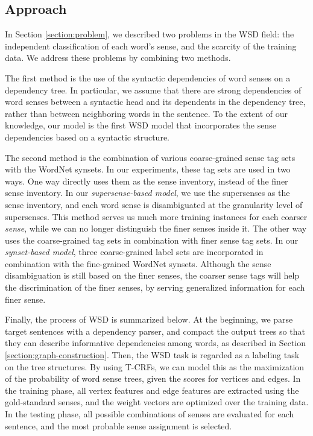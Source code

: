 \documentclass[english]{jnlp_1.4}
\begin{document}
\subsection{Approach}


In Section \ref{section:problem}, we described two problems in the WSD field: the independent classification of each word's sense, and the scarcity of the training data.
We address these problems by combining two methods.


The first method is the use of the syntactic dependencies of word senses on a dependency tree.
In particular, we assume that there are strong dependencies of word senses between a syntactic head and its dependents in the dependency tree, rather than between neighboring words in the sentence.
To the extent of our knowledge, our model is the first WSD model that incorporates the sense dependencies based on a syntactic structure.


The second method is the combination of various coarse-grained sense tag sets with the WordNet synsets.
In our experiments, these tag sets are used in two ways.
One way directly uses them as the sense inventory, instead of the finer sense inventory.
In our \textit{supersense-based model}, we use the supersenses as the sense inventory, and each word sense is disambiguated at the granularity level of supersenses.
This method serves us much more training instances for each coarser \textit{sense}, while we can no longer distinguish the finer senses inside it.
The other way uses the coarse-grained tag sets in combination with finer sense tag sets.
In our \textit{synset-based model}, three coarse-grained label sets are incorporated in combination with the fine-grained WordNet synsets.
Although the sense disambiguation is still based on the finer senses, the coarser sense tags will help the discrimination of the finer senses, by serving generalized information for each finer sense.


Finally, the process of WSD is summarized below.
At the beginning, we parse target sentences with a dependency parser, and compact the output trees so that they can describe informative dependencies among words, as described in Section \ref{section:graph-construction}.
Then, the WSD task is regarded as a labeling task on the tree structures.
By using T-CRFs, we can model this as the maximization of the probability of word sense trees, given the scores for vertices and edges.
In the training phase, all vertex features and edge features are extracted using the gold-standard senses, and the weight vectors are optimized over the training data.
In the testing phase, all possible combinations of senses are evaluated for each sentence, and the most probable sense assignment is selected.
\end{document}
